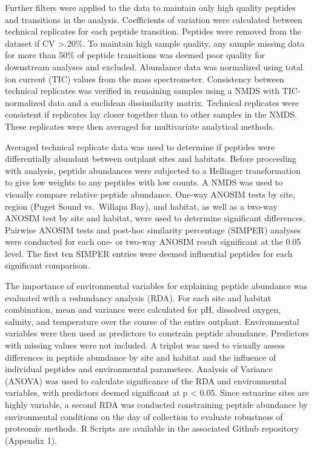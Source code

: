 \documentclass [11pt, proquest] {uwthesis}[2015/03/03]
\begin{document}
Further filters were applied to the data to maintain only high quality peptides and transitions in the analysis. Coefficients of variation were calculated between technical replicates for each peptide transition. Peptides were removed from the dataset if CV \textgreater{} 20\%. To maintain high sample quality, any sample missing data for more than 50\% of peptide transitions was deemed poor quality for downstream analyses and excluded. Abundance data was normalized using total ion current (TIC) values from the mass spectrometer. Consistency between technical replicates was verified in remaining samples using a NMDS with TIC-normalized data and a euclidean dissimilarity matrix. Technical replicates were consistent if replicates lay closer together than to other samples in the NMDS. These replicates were then averaged for multivariate analytical methods.

Averaged technical replicate data was used to determine if peptides were differentially abundant between outplant sites and habitats. Before proceeding with analysis, peptide abundances were subjected to a Hellinger transformation to give low weights to any peptides with low counts. A NMDS was used to visually compare relative peptide abundance. One-way ANOSIM tests by site, region (Puget Sound vs.~Willapa Bay), and habitat, as well as a two-way ANOSIM test by site and habitat, were used to determine significant differences. Pairwise ANOSIM tests and post-hoc similarity percentage (SIMPER) analyses were conducted for each one- or two-way ANOSIM result significant at the 0.05 level. The first ten SIMPER entries were deemed influential peptides for each significant comparison.

The importance of environmental variables for explaining peptide abundance was evaluated with a redundancy analysis (RDA). For each site and habitat combination, mean and variance were calculated for pH, dissolved oxygen, salinity, and temperature over the course of the entire outplant. Environmental variables were then used as predictors to constrain peptide abundance. Predictors with missing values were not included. A triplot was used to visually assess differences in peptide abundance by site and habitat and the influence of individual peptides and environmental parameters. Analysis of Variance (ANOVA) was used to calculate significance of the RDA and environmental variables, with predictors deemed significant at p \textless{} 0.05. Since estuarine sites are highly variable, a second RDA was conducted constraining peptide abundance by environmental conditions on the day of collection to evaluate robustness of proteomic methods. R Scripts are available in the associated Github repository (Appendix 1).
\end{document}
